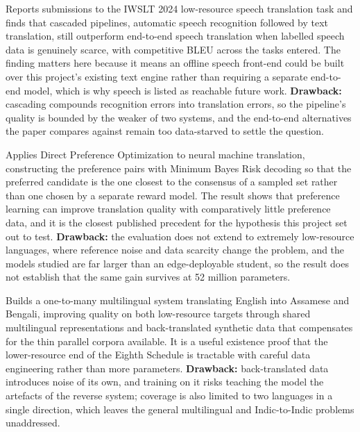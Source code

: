 Reports submissions to the IWSLT 2024 low-resource speech translation
task and finds that cascaded pipelines, automatic speech recognition followed
by text translation, still outperform end-to-end speech translation when
labelled speech data is genuinely scarce, with competitive BLEU across the
tasks entered. The finding matters here because it means an offline speech
front-end could be built over this project's existing text engine rather than
requiring a separate end-to-end model, which is why speech is listed as
reachable future work. \textbf{Drawback:} cascading compounds recognition
errors into translation errors, so the pipeline's quality is bounded by the
weaker of two systems, and the end-to-end alternatives the paper compares
against remain too data-starved to settle the question.

Applies Direct Preference Optimization to neural machine translation,
constructing the preference pairs with Minimum Bayes Risk decoding so that the
preferred candidate is the one closest to the consensus of a sampled set rather
than one chosen by a separate reward model. The result shows that preference
learning can improve translation quality with comparatively little preference
data, and it is the closest published precedent for the hypothesis this project
set out to test. \textbf{Drawback:} the evaluation does not extend to extremely
low-resource languages, where reference noise and data scarcity change the
problem, and the models studied are far larger than an edge-deployable student,
so the result does not establish that the same gain survives at 52 million
parameters.

Builds a one-to-many multilingual system translating English into
Assamese and Bengali, improving quality on both low-resource targets through
shared multilingual representations and back-translated synthetic data that
compensates for the thin parallel corpora available. It is a useful existence
proof that the lower-resource end of the Eighth Schedule is tractable with
careful data engineering rather than more parameters.
\textbf{Drawback:} back-translated data introduces noise of its own, and
training on it risks teaching the model the artefacts of the reverse system;
coverage is also limited to two languages in a single direction, which leaves
the general multilingual and Indic-to-Indic problems unaddressed.

